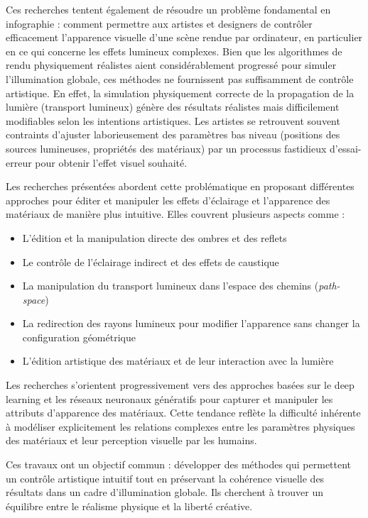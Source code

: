 \documentclass{article}
\begin{document}
Ces recherches tentent également de résoudre un problème fondamental en infographie : comment permettre aux artistes et designers de contrôler efficacement l'apparence visuelle d'une scène rendue par ordinateur, en particulier en ce qui concerne les effets lumineux complexes. Bien que les algorithmes de rendu physiquement réalistes aient considérablement progressé pour simuler l'illumination globale, ces méthodes ne fournissent pas suffisamment de contrôle artistique. En effet, la simulation physiquement correcte de la propagation de la lumière (transport lumineux) génère des résultats réalistes mais difficilement modifiables selon les intentions artistiques. Les artistes se retrouvent souvent contraints d'ajuster laborieusement des paramètres bas niveau (positions des sources lumineuses, propriétés des matériaux) par un processus fastidieux d'essai-erreur pour obtenir l'effet visuel souhaité.

Les recherches présentées abordent cette problématique en proposant différentes approches pour éditer et manipuler les effets d'éclairage et l'apparence des matériaux de manière plus intuitive. Elles couvrent plusieurs aspects comme :
\begin{itemize}
\item L'édition et la manipulation directe des ombres et des reflets
\item Le contrôle de l'éclairage indirect et des effets de caustique
\item La manipulation du transport lumineux dans l'espace des chemins (\textit{path-space})
\item La redirection des rayons lumineux pour modifier l'apparence sans changer la configuration géométrique
\item L'édition artistique des matériaux et de leur interaction avec la lumière
\end{itemize}

Les recherches s'orientent progressivement vers des approches basées sur le deep learning et les réseaux neuronaux génératifs pour capturer et manipuler les attributs d'apparence des matériaux. Cette tendance reflète la difficulté inhérente à modéliser explicitement les relations complexes entre les paramètres physiques des matériaux et leur perception visuelle par les humains.

Ces travaux ont un objectif commun : développer des méthodes qui permettent un contrôle artistique intuitif tout en préservant la cohérence visuelle des résultats dans un cadre d'illumination globale. Ils cherchent à trouver un équilibre entre le réalisme physique et la liberté créative.
\end{document}
